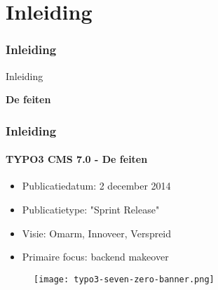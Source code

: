 %

\section{Inleiding}
\begin{frame}[fragile]
	\frametitle{Inleiding}

	\begin{center}\huge{Inleiding}\end{center}
	\begin{center}\huge{\color{typo3darkgrey}\textbf{De feiten}}\end{center}

\end{frame}


\begin{frame}[fragile]
	\frametitle{Inleiding}
	\framesubtitle{TYPO3 CMS 7.0 - De feiten}

	\begin{itemize}
		\item Publicatiedatum: 2 december 2014
		\item Publicatietype: "Sprint Release"
		\item Visie: Omarm, Innoveer, Verspreid
		\item Primaire focus: backend makeover
	\end{itemize}

	\begin{figure}
		\texttt{[image: typo3-seven-zero-banner.png]}
	\end{figure}

\end{frame}

